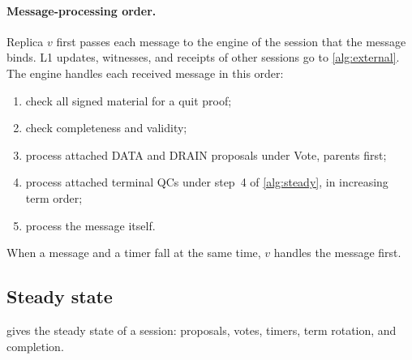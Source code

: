 \documentclass[11pt,a4paper]{article}
\newcommand{\RR}[1]{{\color{rrRed}#1}}
\begin{document}
\paragraph{Message-processing order.}\leavevmode
\RR{Replica $v$ first passes each message to the engine of the session
that the message binds. L1 updates, witnesses, and receipts of other
sessions go to \cref{alg:external}.} The engine handles each received
message in this order:
\begin{enumerate}[label=(\arabic*)]
\item check all signed material for a quit proof;
\item check completeness and validity;
\item process attached DATA \RR{and DRAIN} proposals under Vote, parents
first;
\item process attached terminal QCs under step~4 of \cref{alg:steady},
in increasing term order;
\item process the message itself.
\end{enumerate}
When a message and a timer fall at the same time, $v$ handles the
message first.

\subsection{Steady state}
\label{sec:steady}
 gives the steady state of a session: proposals, votes,
timers, term rotation, and completion.
\end{document}
